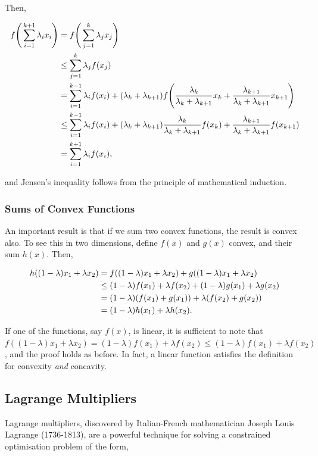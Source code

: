 \documentclass[11pt]{amsart}
\begin{document}
Then,

\begin{align}
f\Bigg(\sum_{i=1}^{k+1}\lambda_i x_i\Bigg) &= f\Bigg(\sum_{j=1}^{k}\lambda_j x_j\Bigg) \notag \\
&\leq \sum_{j=1}^k \lambda_jf(x_j) \notag \\
&= \sum_{i=1}^{k-1} \lambda_if(x_i) + (\lambda_k + \lambda_{k+1})f\Bigg(\frac{\lambda_k}{\lambda_k + \lambda_{k+1}}x_k + \frac{\lambda_{k+1}}{\lambda_k + \lambda_{k+1}}x_{k+1}\Bigg) \notag \\
&\leq \sum_{i=1}^{k-1} \lambda_if(x_i) + (\lambda_k + \lambda_{k+1})\frac{\lambda_k}{\lambda_k + \lambda_{k+1}}f(x_k)+ \frac{\lambda_{k+1}}{\lambda_k + \lambda_{k+1}}f(x_{k+1}) \notag \\
&= \sum_{i=1}^{k+1} \lambda_if(x_i) \notag, 
\end{align}

and Jensen's inequality follows from the principle of mathematical induction.

\subsubsection{Sums of Convex Functions}
An important result is that if we sum two convex functions, the result is convex also. To see this in two dimensions, define $f(x)$ and $g(x)$ convex, and their sum $h(x)$. Then,

\begin{align}
h((1 - \lambda)x_1 + \lambda x_2) &= f((1 - \lambda)x_1 + \lambda x_2) + g((1 - \lambda)x_1 + \lambda x_2) \notag \\
&\leq (1 - \lambda)f(x_1) + \lambda f(x_2) + (1 - \lambda)g(x_1) + \lambda g(x_2) \notag \\
&= (1 - \lambda)(f(x_1) + g(x_1)) + \lambda(f(x_2) + g(x_2)) \notag \\
&= (1 - \lambda)h(x_1) + \lambda h(x_2). \notag
\end{align}

If one of the functions, say $f(x)$, is linear, it is sufficient to note that $f((1 - \lambda)x_1 + \lambda x_2) = (1 - \lambda)f(x_1) + \lambda f(x_2) \leq (1 - \lambda)f(x_1) + \lambda f(x_2)$, and the proof holds as before. In fact, a linear function satisfies the definition for convexity \emph{and} concavity.

\subsection{Lagrange Multipliers}
Lagrange multipliers, discovered by Italian-French mathematician Joseph Louis Lagrange (1736-1813), are a powerful technique for solving a constrained optimisation problem of the form,
\end{document}
